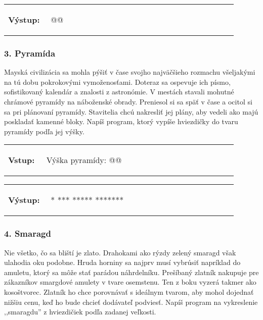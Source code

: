 \vspace{-2em}
\begin{tabular}{@{}p{0.15\linewidth}p{0.75\linewidth}}
\textbf{\small Výstup:} &
\vspace{-3em}
\begin{code}
@\fbox{\textit{*****}}@
\end{code}
\end{tabular}
\vspace{-2em}


\subsubsection*{3. Pyramída}
Mayská civilizácia sa mohla pýšiť v čase svojho najväčšieho rozmachu všeljakými na tú dobu pokrokovými vymoženosťami. Doteraz sa ospevuje ich písmo, sofistikovaný kalendár a znalosti z astronómie. V mestách stavali mohutné chrámové pyramídy na náboženské obrady. Preniesol si sa späť v čase a ocitol si sa pri plánovaní pyramídy. Stavitelia chcú nakresliť jej plány, aby vedeli ako majú poskladať kamenné bloky. Napíš program, ktorý vypíše hviezdičky do tvaru pyramídy podľa jej výšky.

\begin{tabular}{@{}p{0.15\linewidth}p{0.75\linewidth}}
\textbf{\small Vstup:} &
\vspace{-3em}
\begin{code}
Výška pyramídy: @\fbox{4}@
\end{code}
\end{tabular}

\vspace{-2em}
\begin{tabular}{@{}p{0.15\linewidth}p{0.75\linewidth}}
\textbf{\small Výstup:} &
\vspace{-3em}
\begin{code}
   *
  ***
 *****
*******
\end{code}
\end{tabular}
\vspace{-2em}


\subsubsection*{4. Smaragd}
Nie všetko, čo sa bliští je zlato. Drahokami ako rýzdy zelený smaragd však ulahodia oku podobne. Hruda horniny sa najprv musí vybrúsiť napríklad do amuletu, ktorý sa môže stať parádou náhrdelníku. Prešíbaný zlatník nakupuje pre zákazníkov smargdové amulety v tvare osemstenu. Ten z boku vyzerá takmer ako kosoštvorec. Zlatník ho chce porovnávať s ideálnym tvarom, aby mohol dojednať nižšiu cenu, keď ho bude chcieť dodávateľ podviesť. Napíš program na vykreslenie ,,smaragdu'' z hviezdičiek podľa zadanej veľkosti.

